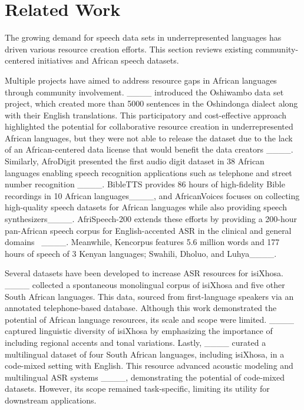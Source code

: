 \section{Related Work}
\label{sec:related}

The growing demand for speech data sets in underrepresented languages has driven various resource creation efforts. This section reviews existing community-centered initiatives and African speech datasets.

Multiple projects have aimed to address resource gaps in African languages through community involvement. ____ introduced the Oshiwambo data set project, which created more than 5000 sentences in the Oshindonga dialect along with their English translations. This participatory and cost-effective approach highlighted the potential for collaborative resource creation in underrepresented African languages, but they were not able to release the dataset due to the lack of an African-centered data license that would benefit the data creators ____. Similarly, AfroDigit presented the first audio digit dataset in 38 African languages enabling speech recognition applications such as telephone and street number recognition ____. BibleTTS provides 86 hours of high-fidelity Bible recordings in 10 African languages____, and AfricanVoices focuses on collecting high-quality speech datasets for African languages while also providing speech synthesizers____. AfriSpeech-200 extends these efforts by providing a 200-hour pan-African speech corpus for English-accented ASR in the clinical and general domains~ ____. Meanwhile, Kencorpus features 5.6 million words and 177 hours of speech of 3 Kenyan languages; Swahili, Dholuo, and Luhya____.

Several datasets have been developed to increase ASR resources for isiXhosa. ____ collected a spontaneous monolingual corpus of isiXhosa and five other South African languages. This data, sourced from first-language speakers via an annotated telephone-based database. Although this work demonstrated the potential of African language resources, its scale and scope were limited. ____ captured linguistic diversity of isiXhosa by emphasizing the importance of including regional accents and tonal variations. Lastly, ____ curated a multilingual dataset of four South African languages, including isiXhosa, in a code-mixed setting with English. This resource advanced acoustic modeling and multilingual ASR systems ____, demonstrating the potential of code-mixed datasets. However, its scope remained task-specific, limiting its utility for downstream applications.

